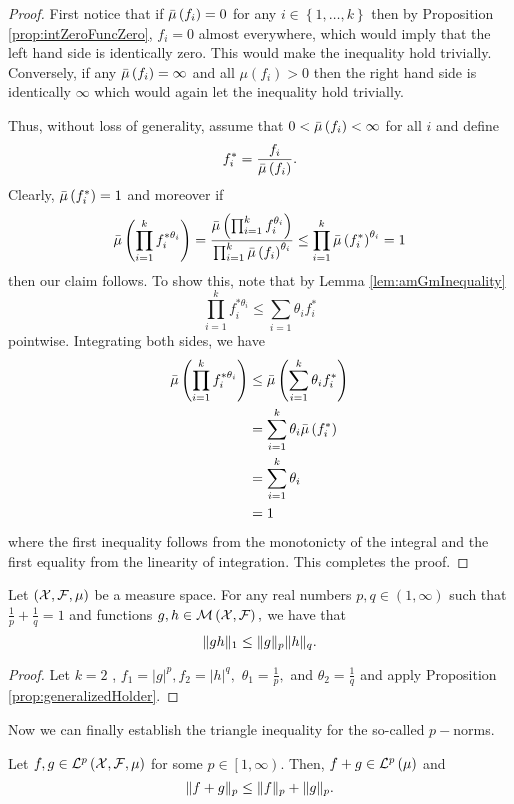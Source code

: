 \begin{proof}
First notice that if $\bar{\mu}\left(f_{i}\right)=0$ for any $i\in\left\{ 1,\ldots,k\right\} $
then by Proposition \ref{prop:intZeroFuncZero}, $f_{i}=0$ almost
everywhere, which would imply that the left hand side is identically
zero. This would make the inequality hold trivially. Conversely, if
any $\bar{\mu}\left(f_{i}\right)=\infty$ and all $\mu\left(f_{i}\right)>0$
then the right hand side is identically $\infty$ which would again
let the inequality hold trivially.

Thus, without loss of generality, assume that $0<\bar{\mu}\left(f_{i}\right)<\infty$
for all $i$ and define 
\[
f_{i}^{*}=\frac{f_{i}}{\bar{\mu}\left(f_{i}\right)}.
\]
Clearly, $\bar{\mu}\left(f_{i}^{*}\right)=1$ and moreover if
\[
\bar{\mu}\left(\prod_{i=1}^{k}f_{i}^{*\theta_{i}}\right)=\frac{\bar{\mu}\left(\prod_{i=1}^{k}f_{i}^{\theta_{i}}\right)}{\prod_{i=1}^{k}\bar{\mu}\left(f_{i}\right)^{\theta_{i}}}\leq\prod_{i=1}^{k}\bar{\mu}\left(f_{i}^{*}\right)^{\theta_{i}}=1
\]
then our claim follows. To show this, note that by Lemma \ref{lem:amGmInequality}
\[
\prod_{i=1}^{k}f_{i}^{*\theta_{i}}\leq\sum_{i=1}\theta_{i}f_{i}^{*}
\]
pointwise. Integrating both sides, we have 
\begin{align*}
\bar{\mu}\left(\prod_{i=1}^{k}f_{i}^{*\theta_{i}}\right) & \leq\bar{\mu}\left(\sum_{i=1}^{k}\theta_{i}f_{i}^{*}\right)\\
 & =\sum_{i=1}^{k}\theta_{i}\bar{\mu}\left(f_{i}^{*}\right)\\
 & =\sum_{i=1}^{k}\theta_{i}\\
 & =1
\end{align*}
where the first inequality follows from the monotonicty of the integral
and the first equality from the linearity of integration. This completes
the proof.
\end{proof}
\begin{cor}
\label{cor:holdersInequality}Let $\left(\mathcal{X},\mathcal{F},\mu\right)$ be a
measure space. For any real numbers $p,q\in\left(1,\infty\right)$
such that $\frac{1}{p}+\frac{1}{q}=1$ and functions $g,h\in\mathcal{M}\left(\mathcal{X},\mathcal{F}\right),$
we have that
\[
\lVert gh\rVert_{1}\leq\lVert g\rVert_{p}\lVert h\rVert_{q}.
\]
\end{cor}

\begin{proof}
Let $k=2$ , $f_{1}=\lvert g\rvert^{p},f_{2}=\lvert h\rvert^{q},$
$\theta_{1}=\frac{1}{p},$ and $\theta_{2}=\frac{1}{q}$ and apply
Proposition \ref{prop:generalizedHolder}.
\end{proof}
Now we can finally establish the triangle inequality for the so-called
$p-$norms.
\begin{thm}
\label{thm:minkowskiInequality}Let $f,g\in\mathcal{L}^{p}\left(\mathcal{X},\mathcal{F},\mu\right)$ for
some $p\in\left[1,\infty\right).$ Then, $f+g\in\mathcal{L}^{p}\left(\mu\right)$ and 
\[
\lVert f+g\rVert_{p}\leq\lVert f\rVert_{p}+\lVert g\rVert_{p}.
\]
\end{thm}

